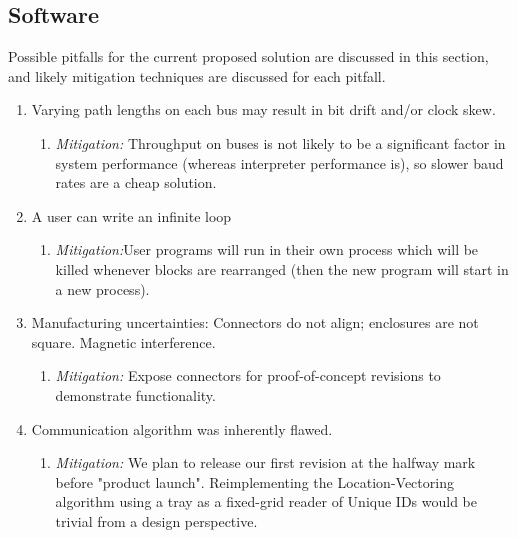   \subsection{Software}
    Possible pitfalls for the current proposed solution are discussed in this section, and likely mitigation techniques are discussed for each pitfall.
    \begin{enumerate}

      \item Varying path lengths on each bus may result in bit drift and/or clock skew.
      \begin{enumerate}
        \item \textit{Mitigation:} Throughput on buses is not likely to be a significant factor in system performance (whereas interpreter performance is), so slower baud rates are a cheap solution.
      \end{enumerate}


      \item A user can write an infinite loop
      \begin{enumerate}
        \item \textit{Mitigation:}User programs will run in their own process which will be killed whenever blocks are rearranged (then the new program will start in a new process).
      \end{enumerate}

      \item Manufacturing uncertainties: Connectors do not align; enclosures are not square. Magnetic interference.
      \begin{enumerate}
        \item \textit{Mitigation:} Expose connectors for proof-of-concept revisions to demonstrate functionality.
      \end{enumerate}

      \item Communication algorithm was inherently flawed.
      \begin{enumerate}
        \item \textit{Mitigation:} We plan to release our first revision at the halfway mark before "product launch". Reimplementing the Location-Vectoring algorithm using a tray as a fixed-grid reader of Unique IDs would be trivial from a design perspective.
      \end{enumerate}

    \end{enumerate}
   
